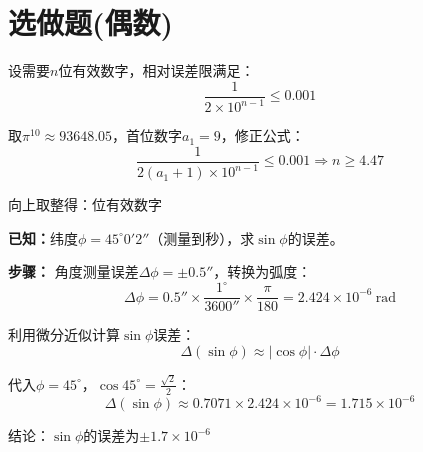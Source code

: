 \documentclass[UTF8]{ctexart}
\begin{document}
	\section{选做题(偶数)}
\begin{tcolorbox}[colback=green!5!white,colframe=green!75!black,title=2 $\pi^{10}$的有效数字分析]
	设需要$n$位有效数字，相对误差限满足：
	\begin{equation}
	\frac{1}{2 \times 10^{n-1}} \leq 0.001
	\end{equation}
	
	取$\pi^{10} \approx 93648.05$，首位数字$a_1=9$，修正公式：
	\begin{equation}
	\frac{1}{2(a_1+1) \times 10^{n-1}} \leq 0.001 \Rightarrow n \geq 4.47
	\end{equation}
	
	向上取整得：位有效数字
\end{tcolorbox}
\begin{tcolorbox}[colback=green!5!white,colframe=green!75!black,title=4 纬度计算误差分析]
\textbf{已知：}纬度$\phi = 45^\circ 0'2''$（测量到秒），求$\sin\phi$的误差。

\textbf{步骤：}
角度测量误差$\Delta\phi = \pm0.5''$，转换为弧度：
\begin{equation}
\Delta\phi = 0.5'' \times \frac{1^\circ}{3600''} \times \frac{\pi}{180} = 2.424\times10^{-6}\ \mathrm{rad}
\end{equation}

利用微分近似计算$\sin\phi$误差：
\begin{equation}
\Delta(\sin\phi) \approx |\cos\phi| \cdot \Delta\phi
\end{equation}

代入$\phi=45^\circ$，$\cos45^\circ=\frac{\sqrt{2}}{2}$：
\begin{equation}
\Delta(\sin\phi) \approx 0.7071 \times 2.424\times10^{-6} = 1.715\times10^{-6}
\end{equation}

结论：$\sin\phi$的误差为$\pm1.7\times10^{-6}$
\end{tcolorbox}
\end{document}
